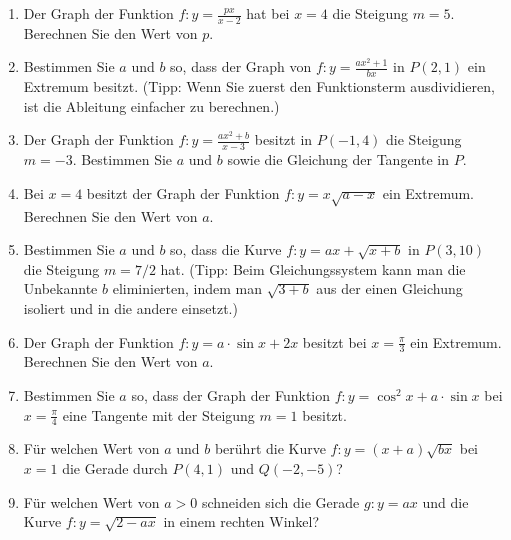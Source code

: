\begin{ueb}
\begin{enumerate}
		\item Der Graph der Funktion $f\colon y=\frac{p x}{x-2}$ hat bei $x=4$ die Steigung $m=5$. Berechnen Sie den Wert von $p$.
		\item Bestimmen Sie $a$ und $b$ so, dass der Graph von $f\colon y=\frac{a x^{2}+1}{b x}$ in $P(2,1)$ ein Extremum besitzt. (Tipp: Wenn Sie zuerst den Funktionsterm ausdividieren, ist die Ableitung einfacher zu berechnen.)
		\item Der Graph der Funktion $f\colon y=\frac{a x^{2}+b}{x-3}$ besitzt in $P(-1, 4)$ die Steigung $m=-3$. Bestimmen Sie $a$ und $b$ sowie die Gleichung der Tangente in $P$.
		\item Bei $x=4$ besitzt der Graph der Funktion $f\colon y=x\sqrt{a-x}$ ein Extremum. Berechnen Sie den Wert von $a$.
		\item Bestimmen Sie $a$ und $b$ so, dass die Kurve $f\colon y=a x+\sqrt{x+b}$ in $P(3, 10)$ die Steigung $m=7/2$ hat. (Tipp: Beim Gleichungssystem kann man die Unbekannte $b$ eliminierten, indem man $\sqrt{3+b}$ aus der einen Gleichung isoliert und in die andere einsetzt.)
		\item Der Graph der Funktion $f\colon y=a\cdot \sin x + 2x$ besitzt bei $x=\frac{\pi}{3}$ ein Extremum. Berechnen Sie den Wert von $a$.
		\item Bestimmen Sie $a$ so, dass der Graph der Funktion $f\colon y=\cos^{2}x + a\cdot \sin x$ bei $x=\frac{\pi}{4}$ eine Tangente mit der Steigung $m=1$ besitzt.
		\item Für welchen Wert von $a$ und $b$ berührt die Kurve $f\colon y=(x+a)\sqrt{b x}$ bei $x=1$ die Gerade durch $P(4, 1)$ und $Q(-2, -5)$?
		\item Für welchen Wert von $a>0$ schneiden sich die Gerade $g\colon y=a x$ und die Kurve $f\colon y=\sqrt{2-ax}$ in einem rechten Winkel?



\end{enumerate}
\end{ueb}
